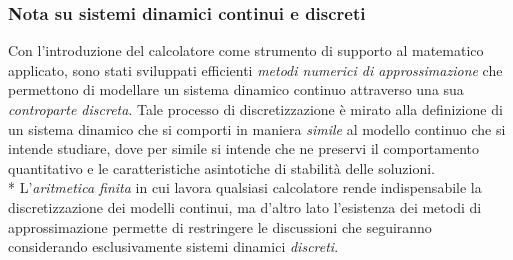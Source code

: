 \subsubsection{Nota su sistemi dinamici continui e discreti}
Con l'introduzione del calcolatore come strumento di supporto al matematico applicato, sono stati sviluppati efficienti \emph{metodi numerici di approssimazione} che permettono di modellare un sistema dinamico continuo attraverso una sua \emph{controparte discreta}. Tale processo di discretizzazione \`e mirato alla definizione di un sistema dinamico che si comporti in maniera \emph{simile} al modello continuo che si intende studiare, dove per simile si intende che ne preservi il comportamento quantitativo e le caratteristiche asintotiche di stabilit\`a delle soluzioni.\\*
L'\emph{aritmetica finita} in cui lavora qualsiasi calcolatore rende indispensabile la discretizzazione dei modelli continui, ma d'altro lato l'esistenza dei metodi di approssimazione permette di restringere le discussioni che seguiranno considerando esclusivamente sistemi dinamici \emph{discreti}. \cite{gigi}

